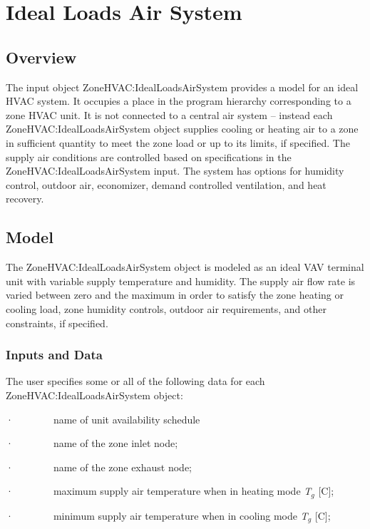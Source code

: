 \section{Ideal Loads Air System }\label{ideal-loads-air-system}

\subsection{Overview}\label{overview-021}

The input object ZoneHVAC:IdealLoadsAirSystem provides a model for an ideal HVAC system. It occupies a place in the program hierarchy corresponding to a zone HVAC unit. It is not connected to a central air system -- instead each ZoneHVAC:IdealLoadsAirSystem object supplies cooling or heating air to a zone in sufficient quantity to meet the zone load or up to its limits, if specified. The supply air conditions are controlled based on specifications in the ZoneHVAC:IdealLoadsAirSystem input. The system has options for humidity control, outdoor air, economizer, demand controlled ventilation, and heat recovery.

\subsection{Model}\label{model-002}

The ZoneHVAC:IdealLoadsAirSystem object is modeled as an ideal VAV terminal unit with variable supply temperature and humidity. The supply air flow rate is varied between zero and the maximum in order to satisfy the zone heating or cooling load, zone humidity controls, outdoor air requirements, and other constraints, if specified.

\subsubsection{Inputs and Data}\label{inputs-and-data-001}

The user specifies some or all of the following data for each ZoneHVAC:IdealLoadsAirSystem object:

·~~~~~~~~name of unit availability schedule

·~~~~~~~~name of the zone inlet node;

·~~~~~~~~name of the zone exhaust node;

·~~~~~~~~maximum supply air temperature when in heating mode \emph{T\(_{g}\)} {[}C{]};

·~~~~~~~~minimum supply air temperature when in cooling mode \emph{T\(_{g}\)} {[}C{]};

